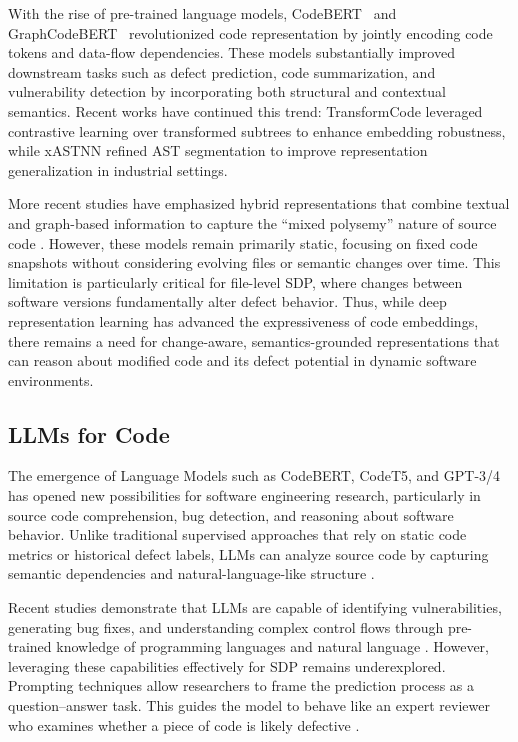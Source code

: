 \documentclass[authoryear,final,5p,times,twocolumn]{elsarticle}
\theoremstyle{plain}
\begin{document}
With the rise of pre-trained language models, CodeBERT~\citep{feng2020codebert} and GraphCodeBERT~\citep{guo2021graphcodebert} revolutionized code representation by jointly encoding code tokens and data-flow dependencies. These models substantially improved downstream tasks such as defect prediction, code summarization, and vulnerability detection by incorporating both structural and contextual semantics. Recent works have continued this trend: TransformCode \citep{xian2024transformcode} leveraged contrastive learning over transformed subtrees to enhance embedding robustness, while xASTNN \citep{xu2023xastnn} refined AST segmentation to improve representation generalization in industrial settings.

More recent studies have emphasized hybrid representations that combine textual and graph-based information to capture the ``mixed polysemy'' nature of source code \citep{li2023contextuality, wang2023tree}. However, these models remain primarily static, focusing on fixed code snapshots without considering evolving files or semantic changes over time. This limitation is particularly critical for file-level SDP, where changes between software versions fundamentally alter defect behavior. Thus, while deep representation learning has advanced the expressiveness of code embeddings, there remains a need for change-aware, semantics-grounded representations that can reason about modified code and its defect potential in dynamic software environments.

\subsection{LLMs for Code}
The emergence of Language Models such as CodeBERT, CodeT5, and GPT-3/4 has opened new possibilities for software engineering research, particularly in source code comprehension, bug detection, and reasoning about software behavior. Unlike traditional supervised approaches that rely on static code metrics or historical defect labels, LLMs can analyze source code by capturing semantic dependencies and natural-language-like structure \citep{feng2020codebert, ahmad2021unified}.

Recent studies demonstrate that LLMs are capable of identifying vulnerabilities, generating bug fixes, and understanding complex control flows through pre-trained knowledge of programming languages and natural language \citep{xu2022systematic, jiang2026llm_code_survey}. However, leveraging these capabilities effectively for SDP remains underexplored. Prompting techniques allow researchers to frame the prediction process as a question–answer task. This guides the model to behave like an expert reviewer who examines whether a piece of code is likely defective \citep{white2023chatgpt, peng2023impact}.
\end{document}
